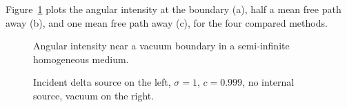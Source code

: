 Figure~\ref{fig:bndycondAngularIntensity} plots the angular intensity at the
boundary (a), half a mean free path away (b), and one mean free path away (c),
for the four compared methods. 
\begin{figure}[htb]
  \centering
  \hspace{-.6in}
  \subfigure[$x=0.00125$]{
  
  }
  \hspace{-.2in}
  \subfigure[$x=0.5$]{
  
  }
  \hspace{-.6in}

  \subfigure[$x=1$]{
  
  }
  \caption{Angular intensity near a vacuum boundary in a semi-infinite
  homogeneous medium.}
  \label{fig:bndycondAngularIntensity}
\end{figure}


\clearpage
\begin{figure}[htb]
  \centering
  \hspace{-.6in}
  \hspace{-.2in}
  \hspace{-.6in}
  \caption{Incident delta source on the left, $\sigma=1$,
  $c=0.999$, no internal source, vacuum on the right.}
  \label{fig:bndycondSolutions}
\end{figure}

